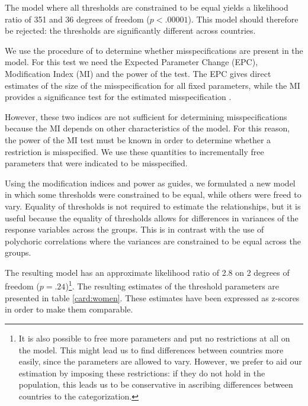 \documentclass[a4paper,12pt]{article}
\begin{document}
The model where all thresholds are constrained to be equal yields a likelihood ratio of 351 and 36 degrees of freedom ($p<.00001$). This model should therefore be rejected: the thresholds are significantly different across countries. 

We use the procedure of \citet{saris_power} to determine whether misspecifications are present in the model. For this test we need the Expected Parameter Change (EPC), Modification Index (MI) and the power of the test. The EPC gives direct estimates of the size of the misspecification for all fixed parameters, while the MI provides a significance test for the estimated misspecification \citep{saris_detection_1987}. 

However, these two indices are not sufficient for determining misspecifications because the MI depends on other characteristics of the model. For this reason, the  power of the MI test must be known in order to determine whether a restriction is misspecified. We use these quantities to incrementally free parameters that were indicated to be misspecified.

Using the modification indices and power as guides, we formulated a new model in which some thresholds were constrained to be equal, while others were freed to vary. Equality of thresholds is not required to estimate the relationships, but it is useful because the equality of thresholds allows for differences in variances of the response variables across the groups. This is in contrast with the use of polychoric correlations where the variances are constrained to be equal across the groups.

 The resulting model has an approximate likelihood ratio of 2.8 on 2 degrees of freedom ($p=.24$)\footnote{It is also possible to free more parameters and put no restrictions at all on the model. This might lead us to find differences between countries more easily, since the parameters are allowed to vary. However, we prefer to aid our estimation by imposing these restrictions: if they do not hold in the population, this leads us to be conservative in ascribing differences between countries to the categorization.}. The resulting estimates of the threshold parameters are presented in table \ref{card:women}. These estimates have been expressed as z-scores in order to make them comparable.
\end{document}
